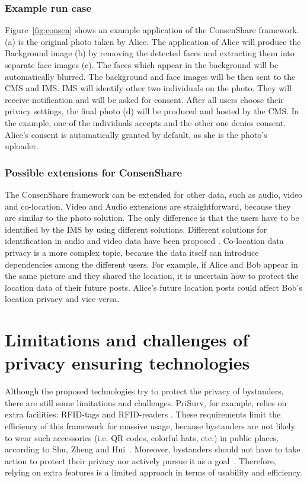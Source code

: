 \documentclass[conference, 11pt]{IEEEtran}
\begin{document}
\subsubsection{Example run case}
Figure~\ref{fig:consen} shows an example application of the ConsenShare framework. (a) is the original photo taken by Alice. The application of Alice will produce the Background image (b) by removing the detected faces and extracting them into separate face images (c). The faces which appear in the background will be automatically blurred. The background and face images will be then sent to the \ac{CMS} and \ac{IMS}. \ac{IMS} will identify other two individuals on the photo. They will receive notification and will be asked for consent. After all users choose their privacy settings, the final photo (d) will be produced and hosted by the \ac{CMS}. In the example, one of the individuals accepts and the other one denies consent. Alice’s consent is automatically granted by default, as she is the photo’s uploader. 

\subsubsection{Possible extensions for ConsenShare}
The ConsenShare framework can be extended for other data, such as audio, video and co-location. Video and Audio extensions are straightforward, because they are similar to the photo solution. The only difference is that the users have to be identified by the \ac{IMS} by using different solutions. Different solutions for identification in audio and video data have been proposed \cite{reynolds2002, mansour2015}. Co-location data privacy is a more complex topic, because the data itself can introduce dependencies among the different users. For example, if Alice and Bob appear in the same picture and they shared the location, it is uncertain how to protect the location data of their future posts. Alice’s future location posts could affect Bob’s location privacy and vice versa. 

\section{Limitations and challenges of privacy ensuring technologies}\label{Limitations}
Although the proposed technologies try to protect the privacy of bystanders, there are still some limitations and challenges. PriSurv, for example, relies on extra facilities: \ac{RFID}-tags and \ac{RFID}-readers \cite{chinomi2008PriSurv}. These requirements limit the efficiency of this framework for massive usage, because bystanders are not likely to wear such accessories (i.e. QR codes, colorful hats, etc.) in public places, according to Shu, Zheng and Hui~\cite{shu2016cardea}. Moreover, bystanders should not have to take action to protect their privacy nor actively pursue it as a goal~\cite{langheinrich2009privacy}. Therefore, relying on extra features is a limited approach in terms of usability and efficiency.  
\end{document}
